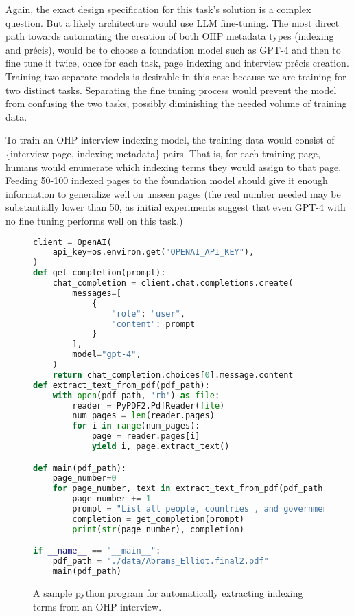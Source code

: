 \documentclass[12pt, oneside]{article}   	%
\begin{document}
Again, the exact design specification for this task's solution is a complex question.  But a likely architecture  would use LLM fine-tuning.   The most direct path towards automating the creation of both OHP metadata types (indexing and pr\'{e}cis), would be to choose a foundation model such as GPT-4 and then to fine tune it twice, once for each task, page indexing and interview pr\'{e}cis creation.  Training two separate models is desirable in this case because we are training for two distinct tasks.  Separating the fine tuning process would prevent the model from confusing the two tasks, possibly diminishing the needed volume of training data.  

To train an OHP interview indexing model, the training data would consist of \{interview page, indexing metadata\} pairs.  That is, for each training page, humans would enumerate which indexing terms they would assign to that page.  Feeding 50-100 indexed pages to the foundation model should give it enough information to generalize well on unseen pages (the real number needed may be substantially lower than 50, as initial experiments suggest that even GPT-4 with no fine tuning performs well on this task.)

\begin{figure}[htbp]
\begin{lstlisting}[language=Python]
client = OpenAI(
    api_key=os.environ.get("OPENAI_API_KEY"),
)
def get_completion(prompt):
    chat_completion = client.chat.completions.create(
        messages=[
            {
                "role": "user",
                "content": prompt
            }
        ],
        model="gpt-4",
    )
    return chat_completion.choices[0].message.content
def extract_text_from_pdf(pdf_path):
    with open(pdf_path, 'rb') as file:
        reader = PyPDF2.PdfReader(file)
        num_pages = len(reader.pages)
        for i in range(num_pages):
            page = reader.pages[i]
            yield i, page.extract_text()

def main(pdf_path):
    page_number=0
    for page_number, text in extract_text_from_pdf(pdf_path):
        page_number += 1
        prompt = "List all people, countries , and government agencies contained in the following text: " + text
        completion = get_completion(prompt)
        print(str(page_number), completion)

if __name__ == "__main__":
    pdf_path = "./data/Abrams_Elliot.final2.pdf"
    main(pdf_path)
\end{lstlisting}
\caption{A sample python program for automatically extracting indexing terms from an OHP interview.}
\label{figure.python}
\end{figure}
\end{document}
